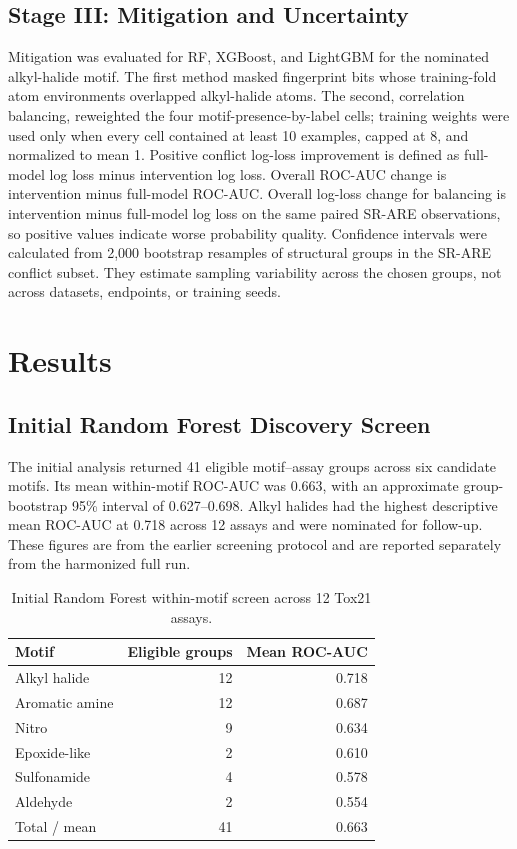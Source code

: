 \documentclass[conference]{IEEEtran}
\begin{document}
\subsection{Stage III: Mitigation and Uncertainty}
Mitigation was evaluated for RF, XGBoost, and LightGBM for the nominated alkyl-halide motif. The first method masked fingerprint bits whose training-fold atom environments overlapped alkyl-halide atoms. The second, correlation balancing, reweighted the four motif-presence-by-label cells; training weights were used only when every cell contained at least 10 examples, capped at 8, and normalized to mean 1. Positive conflict log-loss improvement is defined as full-model log loss minus intervention log loss. Overall ROC-AUC change is intervention minus full-model ROC-AUC. Overall log-loss change for balancing is intervention minus full-model log loss on the same paired SR-ARE observations, so positive values indicate worse probability quality. Confidence intervals were calculated from 2,000 bootstrap resamples of structural groups in the SR-ARE conflict subset. They estimate sampling variability across the chosen groups, not across datasets, endpoints, or training seeds.

\section{Results}
\subsection{Initial Random Forest Discovery Screen}
The initial analysis returned 41 eligible motif--assay groups across six candidate motifs. Its mean within-motif ROC-AUC was 0.663, with an approximate group-bootstrap 95\% interval of 0.627--0.698. Alkyl halides had the highest descriptive mean ROC-AUC at 0.718 across 12 assays and were nominated for follow-up. These figures are from the earlier screening protocol and are reported separately from the harmonized full run.

\begin{table}[t]
\centering
\caption{Initial Random Forest within-motif screen across 12 Tox21 assays.}
\label{tab:initial}
\small
\begin{tabular}{lrr}
\toprule
Motif & Eligible groups & Mean ROC-AUC \\
\midrule
Alkyl halide & 12 & 0.718 \\
Aromatic amine & 12 & 0.687 \\
Nitro & 9 & 0.634 \\
Epoxide-like & 2 & 0.610 \\
Sulfonamide & 4 & 0.578 \\
Aldehyde & 2 & 0.554 \\
\midrule
Total / mean & 41 & 0.663 \\
\bottomrule
\end{tabular}
\end{table}
\end{document}
